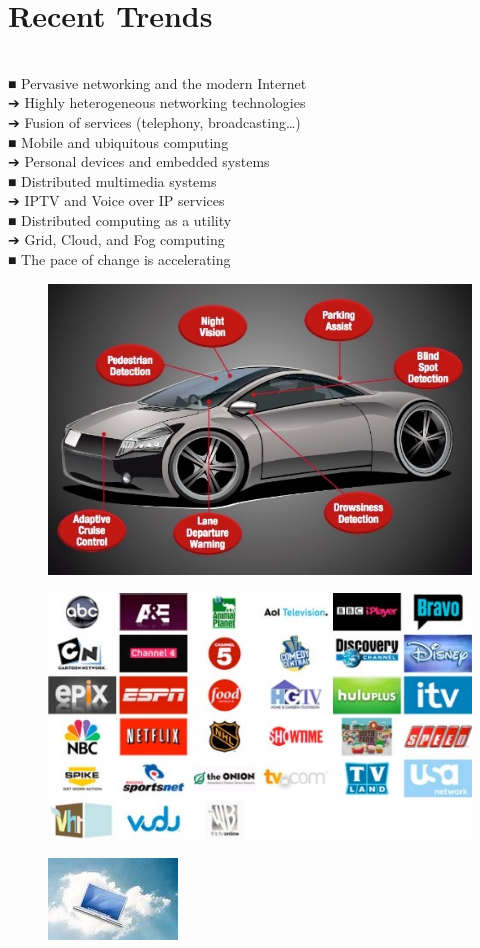 \documentclass[12pt]{article}
\begin{document}
\section{Recent Trends}
\\
■ Pervasive networking and the modern Internet\\
➔ Highly heterogeneous networking technologies\\
➔ Fusion of services (telephony, broadcasting…)\\
■ Mobile and ubiquitous computing\\
➔ Personal devices and embedded systems\\
■ Distributed multimedia systems\\
➔ IPTV and Voice over IP services\\
■ Distributed computing as a utility\\
➔ Grid, Cloud, and Fog computing\\
■ The pace of change is accelerating\\
\begin{figure}[H]
\includegraphics[width=0.5\linewidth]{page15-image-1.png}
\end{figure}
\begin{figure}[H]
\includegraphics[width=0.5\linewidth]{page15-image-2.png}
\end{figure}
\begin{figure}[H]
\includegraphics[width=0.5\linewidth]{page15-image-3.png}
\end{figure}
\end{document}
